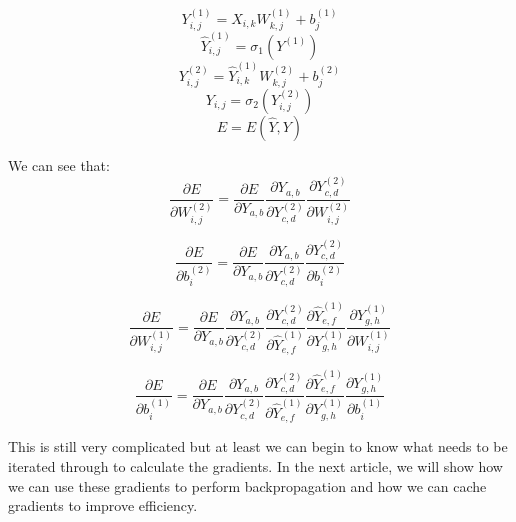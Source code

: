 \documentclass{article}
\begin{document}
\[Y^{(1)}_{i, j} = X_{i, k} W^{(1)}_{k, j} + b^{(1)}_j\]
\[\hat{Y}^{(1)}_{i, j} = \sigma_1(Y^{(1)})\]
\[Y^{(2)}_{i, j} = \hat{Y}^{(1)}_{i, k} W^{(2)}_{k, j} + b^{(2)}_j\]
\[Y_{i, j} = \sigma_2(Y^{(2)}_{i, j})\]
\[E = E(\hat{Y}, Y)\]

We can see that:
\[\frac{\partial E}{\partial W^{(2)}_{i, j}} 
= \frac{\partial E}{\partial Y_{a,b}}
\frac{\partial Y_{a, b}}{\partial Y^{(2)}_{c, d}}
\frac{\partial Y^{(2)}_{c, d}}{\partial W^{(2)}_{i, j}}
\]

\[\frac{\partial E}{\partial b^{(2)}_i} 
= \frac{\partial E}{\partial Y_{a,b}}
\frac{\partial Y_{a, b}}{\partial Y^{(2)}_{c, d}}
\frac{\partial Y^{(2)}_{c, d}}{\partial b^{(2)}_i}
\]

\[\frac{\partial E}{\partial W^{(1)}_{i, j}} 
= \frac{\partial E}{\partial Y_{a,b}}
\frac{\partial Y_{a, b}}{\partial Y^{(2)}_{c, d}}
\frac{\partial Y^{(2)}_{c, d}}{\partial \hat{Y}^{(1)}_{e,f}}
\frac{\partial \hat{Y}^{(1)}_{e,f}}{\partial Y^{(1)}_{g,h}}
\frac{\partial Y^{(1)}_{g,h}}{\partial W^{(1)}_{i, j}}
\]

\[\frac{\partial E}{\partial b^{(1)}_i} 
= \frac{\partial E}{\partial Y_{a,b}}
\frac{\partial Y_{a, b}}{\partial Y^{(2)}_{c, d}}
\frac{\partial Y^{(2)}_{c, d}}{\partial \hat{Y}^{(1)}_{e,f}}
\frac{\partial \hat{Y}^{(1)}_{e,f}}{\partial Y^{(1)}_{g,h}}
\frac{\partial Y^{(1)}_{g,h}}{\partial b^{(1)}_i}
\]

This is still very complicated but at least we can begin to know what needs to be iterated through to calculate the gradients. In the next article, we will show how we can use these gradients to perform backpropagation and how we can cache gradients to improve efficiency.
\end{document}
